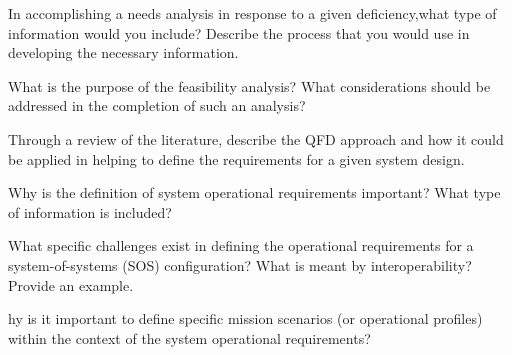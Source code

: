 \begin{exercises}
    \begin{exercise}
    \label{sea-3-1}
        In accomplishing a needs analysis in response to a given deficiency,what type of information would you include? Describe the process that you would use in developing the necessary information.
    \end{exercise}
    \begin{solution}
    \end{solution}
    
    \begin{exercise}
    \label{sea-3-2}
        What is the purpose of the feasibility analysis? What considerations should be addressed in the completion of such an analysis?
    \end{exercise}
    \begin{solution}
    \end{solution}
    
    \begin{exercise}
    \label{sea-3-3}
        Through a review of the literature, describe the QFD approach and how it could be applied in helping to define the requirements for a given system design.
    \end{exercise}
    \begin{solution}
    \end{solution}
    
    \begin{exercise}
    \label{sea-3-4}
        Why is the definition of system operational requirements important? What type of information is included?
    \end{exercise}
    \begin{solution}
    \end{solution}
    
    \begin{exercise}
    \label{sea-3-5}
        What specific challenges exist in defining the operational requirements for a system-of-systems (SOS) configuration? What is meant by interoperability? Provide an example.
    \end{exercise}
    \begin{solution}
    \end{solution}
    
    \begin{exercise}
    \label{sea-3-6}
        hy is it important to define specific mission scenarios (or operational profiles) within the context of the system operational requirements?
    \end{exercise}
    \begin{solution}
    \end{solution}
    

\end{exercises}
